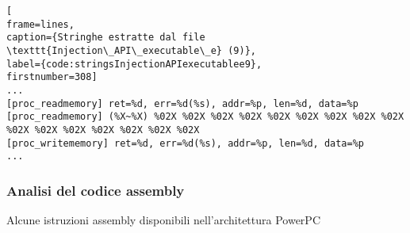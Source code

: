 \documentclass[10pt,a4paper, titlepage]{report}
\begin{document}
\begin{lstlisting}[
frame=lines, 
caption={Stringhe estratte dal file \texttt{Injection\_API\_executable\_e} (9)}, 
label={code:stringsInjectionAPIexecutablee9},
firstnumber=308]
...
[proc_readmemory] ret=%d, err=%d(%s), addr=%p, len=%d, data=%p
[proc_readmemory] (%X~%X) %02X %02X %02X %02X %02X %02X %02X %02X %02X %02X %02X %02X %02X %02X %02X %02X
[proc_writememory] ret=%d, err=%d(%s), addr=%p, len=%d, data=%p
...
\end{lstlisting}


	\newpage
\subsubsection{Analisi del codice assembly}
	
	\begin{table}[h!]
	    \caption{Alcune istruzioni assembly disponibili nell'architettura PowerPC\texttrademark}
	    \centering
	    

\end{table}
\end{document}
